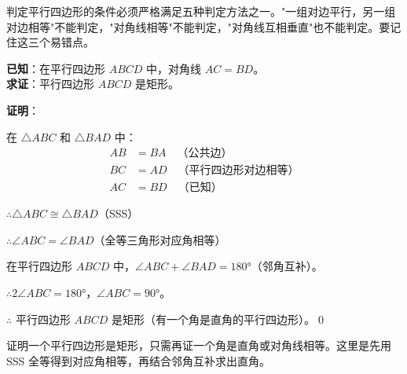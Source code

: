 \documentclass[12pt, a4paper]{ctexart}
\begin{document}
\begin{tipbox}[方法总结]
判定平行四边形的条件必须严格满足五种判定方法之一。"一组对边平行，另一组对边相等"不能判定，"对角线相等"不能判定，"对角线互相垂直"也不能判定。要记住这三个易错点。
\end{tipbox}

\vspace{6pt}

\begin{examplebox}
\textbf{已知}：在平行四边形 $ABCD$ 中，对角线 $AC = BD$。\\
\textbf{求证}：平行四边形 $ABCD$ 是矩形。

\begin{center}
\end{center}
\end{examplebox}

\textbf{证明}：

在 $\triangle ABC$ 和 $\triangle BAD$ 中：
\begin{align*}
AB &= BA \quad \text{（公共边）}\\
BC &= AD \quad \text{（平行四边形对边相等）}\\
AC &= BD \quad \text{（已知）}
\end{align*}

$\therefore \triangle ABC \cong \triangle BAD$（SSS）

$\therefore \angle ABC = \angle BAD$（全等三角形对应角相等）

在平行四边形 $ABCD$ 中，$\angle ABC + \angle BAD = 180°$（邻角互补）。

$\therefore 2\angle ABC = 180°$，$\angle ABC = 90°$。

$\therefore$ 平行四边形 $ABCD$ 是矩形（有一个角是直角的平行四边形）。\qed

\begin{tipbox}[方法总结]
证明一个平行四边形是矩形，只需再证一个角是直角或对角线相等。这里是先用 SSS 全等得到对应角相等，再结合邻角互补求出直角。
\end{tipbox}
\end{document}
